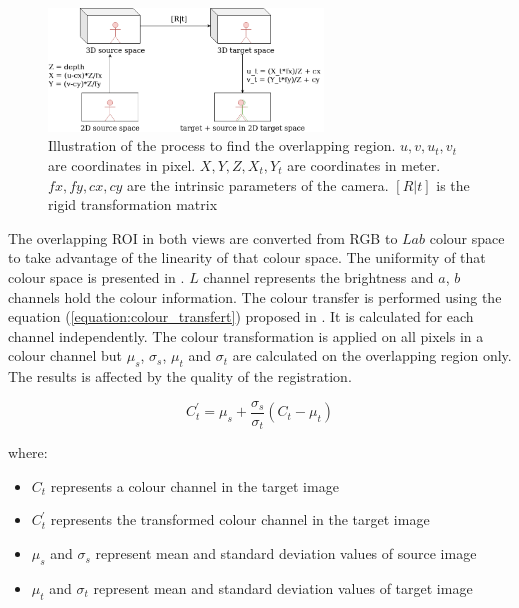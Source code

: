 \begin{figure}[H]
    \centering
    \includegraphics[width=0.65\textwidth]{images/visual_enhancement/colour/overlap.png}
    \caption{Illustration of the process to find the overlapping region. $u, v, u_t, v_t$ are coordinates in pixel. $X, Y, Z, X_t, Y_t$ are coordinates in meter. $fx, fy, cx, cy$ are the intrinsic parameters of the camera. $[R|t]$ is the rigid transformation matrix}
    \label{figure:overlap}
\end{figure}



\label{section:colour tansfer Lab}

The overlapping ROI in both views are converted from RGB to $Lab$ colour space to take advantage of the linearity of that colour space. The uniformity of that colour space is presented in \cite{doi:10.1002/9781119975595.ch3}. $L$ channel represents the brightness and $a$, $b$ channels hold the colour information. The colour transfer is performed using the equation (\ref{equation:colour_transfert}) proposed in \cite{reinhard_color_2001}. It is calculated for each channel independently. The colour transformation is applied on all pixels in a colour channel but $\mu_{s}$, $\sigma_{s}$, $\mu_{t}$ and $\sigma_{t}$ are calculated on the overlapping region only. The results is affected by the quality of the registration.

\begin{equation}
    C_{t}^{\prime}=\mu_{s}+\frac{\sigma_{s}}{\sigma_{t}}\left(C_{t}-\mu_{t}\right)
\label{equation:colour_transfert}
\end{equation}

where:

\begin{itemize}
    \item $C_{t}$ represents a colour channel in the target image
    \item $C_{t}^{\prime}$ represents the transformed colour channel in the target image
    \item $\mu_{s}$ and $\sigma_{s}$ represent mean and standard deviation values of source image
    \item $\mu_{t}$ and $\sigma_{t}$ represent mean and standard deviation values of target image
\end{itemize}



